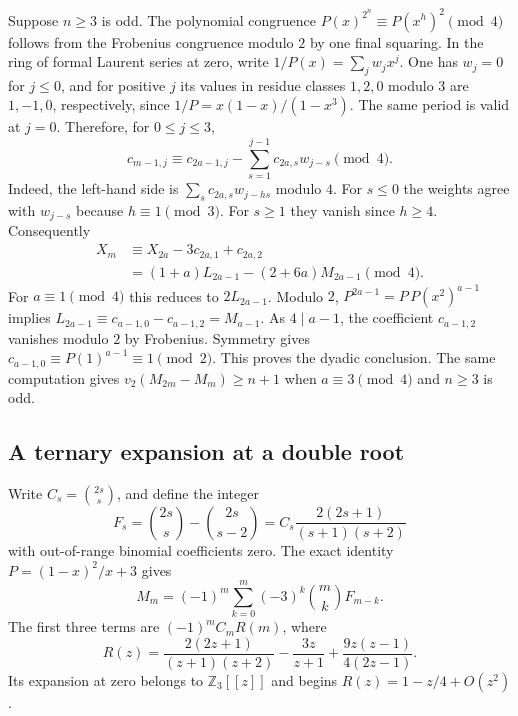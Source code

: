 \documentclass[11pt,a4paper]{article}
\begin{document}
Suppose $n\ge3$ is odd. The polynomial congruence
$P(x)^{2^n}\equiv P(x^h)^2\pmod4$ follows from the
Frobenius congruence modulo $2$ by one final squaring.
In the ring of formal Laurent series at zero, write $1/P(x)=\sum_j w_jx^j$.
One has $w_j=0$ for $j\le0$, and for positive $j$ its values in
residue classes $1,2,0$ modulo $3$ are $1,-1,0$, respectively,
since $1/P=x(1-x)/(1-x^3)$. The same period is valid at $j=0$.
Therefore, for $0\le j\le3$,
\[
 c_{m-1,j}\equiv c_{2a-1,j}
  -\sum_{s=1}^{j-1} c_{2a,s}w_{j-s}\pmod4.
\]
Indeed, the left-hand side is $\sum_s c_{2a,s}w_{j-hs}$ modulo $4$.
For $s\le0$ the weights agree with $w_{j-s}$ because
$h\equiv1\pmod3$. For $s\ge1$ they vanish since $h\ge4$.
Consequently
\[
\begin{split}
 X_m&\equiv X_{2a}-3c_{2a,1}+c_{2a,2}\\
    &=(1+a)L_{2a-1}-(2+6a)M_{2a-1}\pmod4 .
\end{split}
\]
For $a\equiv1\pmod4$ this reduces to $2L_{2a-1}$.
Modulo $2$, $P^{2a-1}=P\,P(x^2)^{a-1}$ implies
$L_{2a-1}\equiv c_{a-1,0}-c_{a-1,2}=M_{a-1}$.
As $4\mid a-1$, the coefficient $c_{a-1,2}$ vanishes modulo $2$
by Frobenius. Symmetry gives
$c_{a-1,0}\equiv P(1)^{a-1}\equiv1\pmod2$.
This proves the dyadic conclusion. The same computation gives
$v_2(M_{2m}-M_m)\ge n+1$ when $a\equiv3\pmod4$
and $n\ge3$ is odd.

\subsection{A ternary expansion at a double root}

Write $C_s=\binom{2s}{s}$, and define the integer
\[
 F_s=\binom{2s}{s}-\binom{2s}{s-2}
     = C_s\frac{2(2s+1)}{(s+1)(s+2)}
\]
with out-of-range binomial coefficients zero. The exact identity
$P=(1-x)^2/x+3$ gives
\[
 M_m=(-1)^m\sum_{k=0}^m(-3)^k\binom{m}{k}F_{m-k}.
\]
The first three terms are $(-1)^m C_m R(m)$, where
\[
 R(z)=\frac{2(2z+1)}{(z+1)(z+2)}-\frac{3z}{z+1}
       +\frac{9z(z-1)}{4(2z-1)} .
\]
Its expansion at zero belongs to $\mathbb Z_3[[z]]$ and begins
$R(z)=1-z/4+O(z^2)$.
\end{document}

